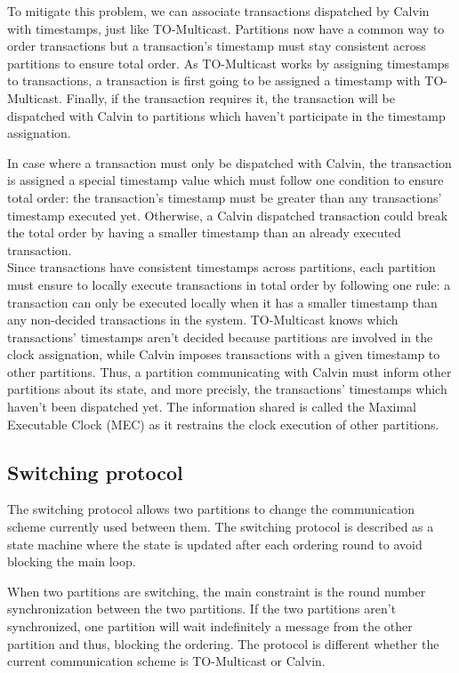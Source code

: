 \documentclass[a4paper, 10pt]{article}
\newcommand{\GE}{TO-Multicast}
\newcommand{\PE}{Calvin}
\newcommand{\Ch}[1]{\mynote{Ch}{#1}{green}}
\begin{document}
   To mitigate this problem, we can associate transactions dispatched by \PE{} with
   timestamps, just like \GE{}. Partitions now have a common way to order transactions but
   a transaction's timestamp must stay consistent across partitions to ensure total order.
   As \GE{} works by assigning timestamps to transactions, a transaction is first going to
   be assigned a timestamp with \GE{}. Finally, if the transaction requires it,
   the transaction will be dispatched with \PE{} to partitions which haven't participate in
   the timestamp assignation.

   In case where a transaction must only be dispatched with \PE{}, the transaction is
   assigned a special timestamp value which must follow one condition to ensure
   total order: the transaction's timestamp must be greater than any transactions' timestamp executed yet.
   Otherwise, a \PE{} dispatched transaction could
   break the total order by having a smaller timestamp than an already executed
   transaction. \\

   Since transactions have consistent timestamps across partitions, each partition
   must ensure to locally execute transactions in total order by following one rule:
   a transaction can only be executed locally when it has a smaller timestamp
   than any non-decided transactions in the system. \Ch{Seems clair why to me. Is it?}
   \GE{} knows which transactions' timestamps aren't decided because partitions are involved in
   the clock assignation, while \PE{} imposes transactions with a given timestamp
   to other partitions. Thus, a partition communicating with \PE{} must inform
   other partitions about its state, and more precisly, the transactions' timestamps which haven't
   been dispatched yet. The information shared is called the Maximal Executable Clock (MEC) as
   it restrains the clock execution of other partitions.

   \subsection{Switching protocol}

   The switching protocol allows two partitions to change the communication scheme currently
   used between them. The switching protocol is described as a state machine where the state is updated
   after each ordering round to avoid blocking the main loop.

   When two partitions are switching, the main constraint is the round number synchronization between
   the two partitions. If the two partitions aren't synchronized, one partition will wait
   indefinitely a message from the other partition and thus, blocking the ordering.
   The protocol is different whether the current communication scheme is \GE{} or \PE{}. \\
\end{document}
